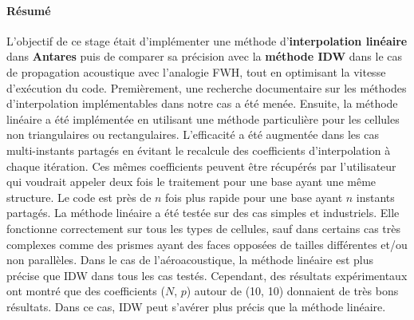 \cleardoublepage
\paragraph{Résumé}
\vspace{0,5cm}
L'objectif de ce stage était d'implémenter une méthode d'\textbf{interpolation linéaire} dans \textbf{Antares} puis de comparer sa précision avec la \textbf{méthode IDW} dans le cas de propagation acoustique avec l'analogie FWH, tout en optimisant la vitesse d'exécution du code.
Premièrement, une recherche documentaire sur les méthodes d'interpolation implémentables dans notre cas a été menée.
Ensuite, la méthode linéaire a été implémentée en utilisant une méthode particulière pour les cellules non triangulaires ou rectangulaires.
L'efficacité a été augmentée dans les cas multi-instants partagés en évitant le recalcule des coefficients d'interpolation à chaque itération. Ces mêmes coefficients peuvent être récupérés par l'utilisateur qui voudrait appeler deux fois le traitement pour une base ayant une même structure.
Le code est près de \(n\) fois plus rapide pour une base ayant \(n\) instants partagés.
La méthode linéaire a été testée sur des cas simples et industriels. Elle fonctionne correctement sur tous les types de cellules, sauf dans certains cas très complexes comme des prismes ayant des faces opposées de tailles différentes et/ou non parallèles.
Dans le cas de l'aéroacoustique, la méthode linéaire est plus précise que IDW dans tous les cas testés. Cependant, des résultats expérimentaux ont montré que des coefficients (\(N\), \(p\)) autour de (10, 10) donnaient de très bons résultats. Dans ce cas, IDW peut s'avérer plus précis que la méthode linéaire.

